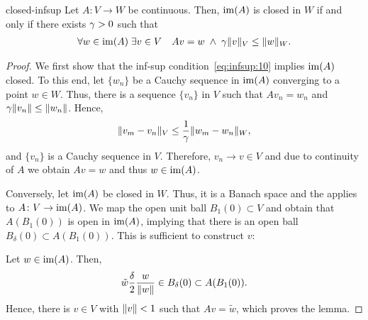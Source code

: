 \begin{Lemma}{closed-infsup}
  Let $A\colon V\to W$ be continuous. Then, $\operatorname{im}(A)$ is closed in
  $W$ if and only if there exists $\gamma>0$ such that
  \begin{gather}
    \label{eq:infsup:10}
    \forall w\in \operatorname{im}(A)\;
    \exists v\in V\quad
    Av = w
    \;\wedge\;
    \gamma \lVert v\rVert_V \le \lVert w\rVert_W.
  \end{gather}
\end{Lemma}

\begin{proof}
  We first show that the inf-sup condition~\eqref{eq:infsup:10}
  implies $\operatorname{im}(A)$ closed. To this end, let $\{w_n\}$ be a Cauchy
  sequence in $\operatorname{im}(A)$ converging to a point $w\in W$. Thus, there
  is a sequence $\{v_n\}$ in $V$ such that $Av_n = w_n$ and
  $\gamma \lVert v_n\rVert \le \lVert w_n\rVert$. Hence,
  \begin{gather*}
    \lVert v_m-v_n\rVert_V \le \frac1{\gamma} \lVert w_m-w_n\rVert_W,
  \end{gather*}
  and $\{v_n\}$ is a Cauchy sequence in $V$. Therefore, $v_n\to v\in
  V$ and due to continuity of $A$ we obtain $Av=w$ and thus $w\in
  \operatorname{im}(A)$.

  Conversely, let $\operatorname{im}(A)$ be closed in $W$. Thus, it is a Banach
  space and the  applies to $A\colon
  V\to\operatorname{im}(A)$. We map the open unit ball $B_1(0)\subset V$ and
  obtain that $A(B_1(0))$ is open in $\operatorname{im}(A)$, implying that there
  is an open ball $B_\delta(0) \subset A(B_1(0))$. This is sufficient
  to construct $v$:

  Let $w\in\operatorname{im}(A)$. Then,
  \begin{gather*}
    \tilde w\frac\delta2 \frac{w}{\lVert w\rVert} \in B_\delta(0) \subset A(B_1(0)).
  \end{gather*}
  Hence, there is $v\in V$ with $\lVert v\rVert<1$ such that $Av=\tilde w$,
  which proves the lemma.
\end{proof}

